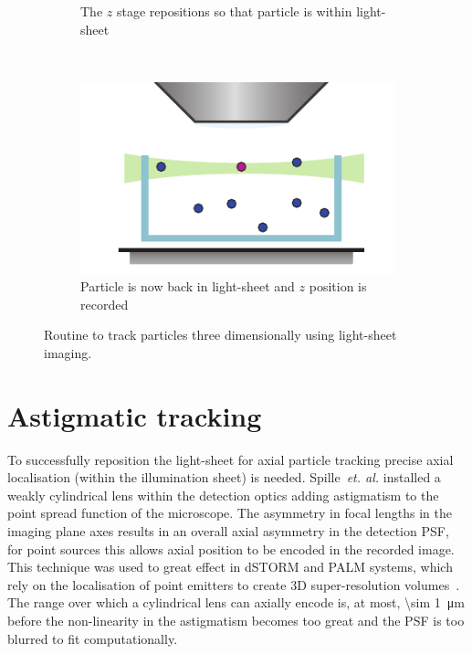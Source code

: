 \begin{figure}
\begin{subfigure}[t]{0.4\linewidth}
		\caption{The \(z\) stage repositions so that particle is within light-sheet}
		\label{fig:SPIMSPT3}
	\end{subfigure}~~
	\begin{subfigure}[t]{0.4\linewidth}
		\centering
		\includegraphics{Chapters/spt/Figs/PDF/tracking/4_piezo_track}
		\caption{Particle is now back in light-sheet and \(z\) position is recorded}
		\label{fig:SPIMSPT4}
	\end{subfigure}
	\caption{Routine to track particles three dimensionally using light-sheet imaging.}
	\label{fig:SPIMSPT}
\end{figure}

\section{Astigmatic tracking}

To successfully reposition the light-sheet for axial particle tracking %
precise axial localisation (within the illumination sheet) is needed.
Spille~\emph{et. al.} installed a weakly cylindrical lens within the detection optics adding astigmatism to the point spread function of the microscope.
The asymmetry in focal lengths
in the imaging plane axes %
results in an overall axial asymmetry in the detection \gls{PSF}, for point sources this allows axial position to be encoded in the recorded image.
This technique was used to great effect in \gls{dSTORM} and PALM systems, which rely on the localisation of point emitters to create \gls{3D} \gls{super-resolution} volumes~\cite{huangThreedimensionalSuperresolutionImaging2008}.
The range over which a cylindrical lens can axially encode is, at most, \SI{\sim 1}{\micro\metre} before the non-linearity in the astigmatism becomes too great and the \gls{PSF} is too blurred to fit computationally.

